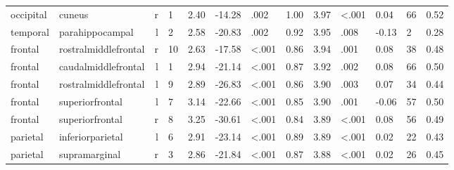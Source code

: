 \documentclass{article}
\begin{document}
\begin{longtable}{llrR{1.3cm}R{1cm}R{1.3cm}R{1cm}R{1cm}R{1.3cm}R{1cm}R{1.8cm}R{1.3cm}R{1.8cm}}
 occipital &                    cuneus &    r &         1 &                  2.40 &           -14.28 &               .002 &                               1.00 &                          3.97 &                   \textless.001 &   0.04 &     66 &      0.52 \\
  temporal &           parahippocampal &    l &         2 &                  2.58 &           -20.83 &               .002 &                               0.92 &                          3.95 &                            .008 &  -0.13 &      2 &      0.28 \\
   frontal &      rostralmiddlefrontal &    r &        10 &                  2.63 &           -17.58 &      \textless.001 &                               0.86 &                          3.94 &                            .001 &   0.08 &     38 &      0.48 \\
   frontal &       caudalmiddlefrontal &    l &         1 &                  2.94 &           -21.14 &      \textless.001 &                               0.87 &                          3.92 &                            .002 &   0.08 &     66 &      0.50 \\
   frontal &      rostralmiddlefrontal &    l &         9 &                  2.89 &           -26.83 &      \textless.001 &                               0.86 &                          3.90 &                            .003 &   0.07 &     34 &      0.44 \\
   frontal &           superiorfrontal &    l &         7 &                  3.14 &           -22.66 &      \textless.001 &                               0.85 &                          3.90 &                            .001 &  -0.06 &     57 &      0.50 \\
   frontal &           superiorfrontal &    r &         8 &                  3.25 &           -30.61 &      \textless.001 &                               0.84 &                          3.89 &                   \textless.001 &   0.08 &     56 &      0.49 \\
  parietal &          inferiorparietal &    l &         6 &                  2.91 &           -23.14 &      \textless.001 &                               0.89 &                          3.89 &                   \textless.001 &   0.02 &     22 &      0.43 \\
  parietal &             supramarginal &    r &         3 &                  2.86 &           -21.84 &      \textless.001 &                               0.87 &                          3.88 &                   \textless.001 &   0.02 &     26 &      0.45 \\

\end{longtable}
\end{document}
